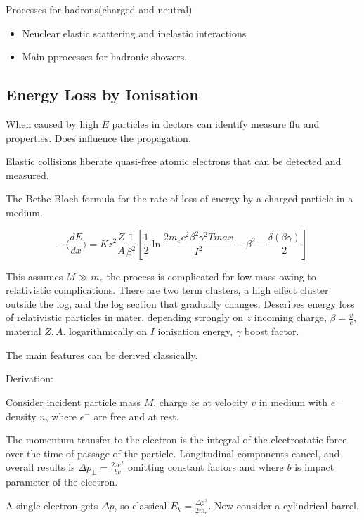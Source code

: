 \documentclass[]{article}
\begin{document}
		Processes for hadrons(charged and neutral)
		\begin{itemize}
			\item Neuclear elastic scattering and inelastic interactions
			\item Main pprocesses for hadronic showers.
		\end{itemize}
		
	\subsection{Energy Loss by Ionisation}
	
	When caused by high $E$ particles in dectors can identify measure flu and properties. Does influence the propagation. 
	
	Elastic collisions liberate quasi-free atomic electrons that can be detected and measured.
	
	The Bethe-Bloch formula for the rate of loss of energy by a charged particle in a medium.
	
	\begin{equation}
	-\langle\frac{dE}{dx}\rangle = Kz^2\frac{Z}{A}\frac{1}{\beta^2}[\frac{1}{2}\ln\frac{2m_ec^2\beta^2\gamma^2Tmax}{I^2} - \beta^2 - \frac{\delta(\beta\gamma)}{2}]
	\end{equation}
	
	This assumes $M \gg m_e$ the process is complicated for low mass owing to relativistic complications. There are two term clusters, a high effect cluster outside the log, and the log section that gradually changes. Describes energy loss of relativistic particles in mater, depending strongly on $z$ incoming charge, $\beta = \frac{v}{c}$, material $Z, A$. logarithmically on $I$ ionisation energy, $\gamma$ boost factor.
	
	The main features can be derived classically.
	
	Derivation:
	
	Consider incident particle mass $M$, charge $ze$ at velocity $v$ in medium with $e^-$ density $n$, where $e^-$ are free and at rest.
	
	The momentum transfer to the electron is the integral of the electrostatic force over the time of passage of the particle. Longitudinal components cancel, and overall results is $\Delta p_\perp = \frac{2ze^2}{bv}$ omitting constant factors and where $b$ is impact parameter of the electron.
	
	A single electron gets $\Delta p$, so classical $E_k = \frac{\Delta p^2}{2m_e}$. Now consider a cylindrical barrel. 
\end{document}

